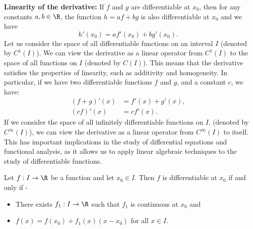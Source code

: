 \documentclass[openany]{book}
\begin{document}
\begin{mynote}
\textbf{Linearity of the derivative:} If $f$ and $g$ are differentiable at $x_0$, then for any constants $a, b \in \R$, the function $h = af + bg$ is also differentiable at $x_0$ and we have 
\[
    h'(x_0) = a f'(x_0) + b g'(x_0).
\]
Let us consider the space of all differentiable functions on an interval $I$ (denoted by $C^1(I)$). We can view the derivative as a linear operator from $C^1(I)$ to the space of all functions on $I$ (denoted by $C(I)$). This means that the derivative satisfies the properties of linearity, such as additivity and homogeneity. In particular, if we have two differentiable functions $f$ and $g$, and a constant $c$, we have:
\begin{align*}
    (f + g)'(x) &= f'(x) + g'(x), \\
    (cf)'(x) &= c f'(x).
\end{align*}
If we consider the space of all infinitely differentiable functions on $I$. (denoted by $C^\infty(I)$), we can view the derivative as a linear operator from $C^\infty(I)$ to itself. This has important implications in the study of differential equations and functional analysis, as it allows us to apply linear algebraic techniques to the study of differentiable functions.
\end{mynote}
\begin{mytheorem}
    Let $f: I \to \R$ be a function and let $x_0 \in I$. Then $f$ is differentiable at $x_0$ if and only if -
    \begin{itemize}
        \item There exists $f_1: I \to \R$ such that $f_1$ is continuous at $x_0$ and
        \item $f(x) = f(x_0) + f_1(x)(x - x_0)$ for all $x \in I$.
    \end{itemize}
\end{mytheorem}
\end{document}
